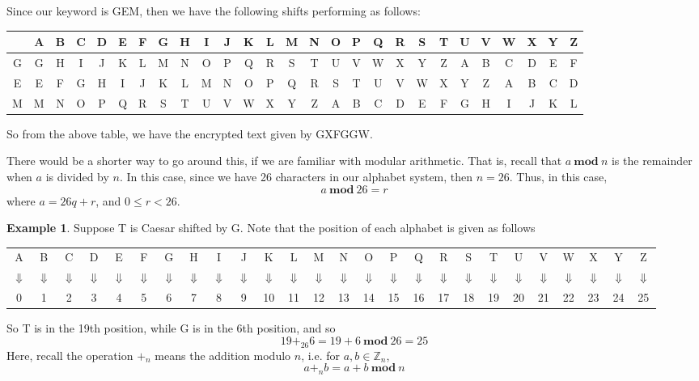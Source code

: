 \documentclass[11pt]{amsart}
\renewcommand{\mod}{\ \mathbf{mod} \ }
\theoremstyle{definition}\newtheorem{definition}{Definition}
\theoremstyle{definition}\newtheorem{example}{Example}
\theoremstyle{definition}\newtheorem{samplecode}{Sample Code}
\begin{document}
Since our keyword is GEM, then we have the following shifts performing as follows:
\begin{center}
    \begin{tabular}{c|cccccccccccccccccccccccccc}
        & A & B & C & D & E & F & G & H & I & J & K & L & M & N & O & P & Q & R & S & T & U & V & W & X & Y & Z \\ \hline
        G & G & H & I & J & K & L & M & N & O & P & Q & R & S & T & U & V & W & X & Y & Z & A & B & C & D & E & F \\
        E & E & F & G & H & I & J & K & L & M & N & O & P & Q & R & S & T & U & V & W & X & Y & Z & A & B & C & D \\
        M & M & N & O & P & Q & R & S & T & U & V & W & X & Y & Z & A & B & C & D & E & F & G & H & I & J & K & L \\
    \end{tabular}
\end{center}
So from the above table, we have the encrypted text given by GXFGGW.

There would be a shorter way to go around this, if we are familiar with modular arithmetic. That is, recall that $a \mod n$ is the remainder when $a$ is divided by $n$. In this case, since we have 26 characters in our alphabet system, then $n = 26$. Thus, in this case,
\begin{equation*}
    a \mod 26 = r
\end{equation*}
where $a = 26q + r$, and $0 \leq r < 26$.

\begin{example}
    Suppose T is Caesar shifted by G. Note that the position of each alphabet is given as follows
    \begin{center}
        \begin{tabular}{cccccccccccccccccccccccccc}
            A & B & C & D & E & F & G & H & I & J & K & L & M & N & O & P & Q & R & S & T & U & V & W & X & Y & Z \\
            $\Downarrow$ & $\Downarrow$ & $\Downarrow$ & $\Downarrow$ & $\Downarrow$ & $\Downarrow$ & $\Downarrow$ & $\Downarrow$ & $\Downarrow$ & $\Downarrow$ & $\Downarrow$ & $\Downarrow$ & $\Downarrow$ & $\Downarrow$ & $\Downarrow$ & $\Downarrow$ & $\Downarrow$ & $\Downarrow$ & $\Downarrow$ & $\Downarrow$ & $\Downarrow$ & $\Downarrow$ & $\Downarrow$ & $\Downarrow$ & $\Downarrow$ & $\Downarrow$ \\
            0 & 1 & 2 & 3 & 4 & 5 & 6 & 7 & 8 & 9 & 10 & 11 & 12 & 13 & 14 & 15 & 16 & 17 & 18 & 19 & 20 & 21 & 22 & 23 & 24 & 25
        \end{tabular}
    \end{center}
    So T is in the 19th position, while G is in the 6th position, and so
    \begin{equation*}
        19 +_{26} 6 = 19 + 6 \mod 26 = 25
    \end{equation*}
    Here, recall the operation $+_n$ means the addition modulo $n$, i.e. for $a, b \in \mathbb{Z}_n$,
    \begin{equation*}
        a +_n b = a + b \mod n
    \end{equation*}
\end{example}
\end{document}
